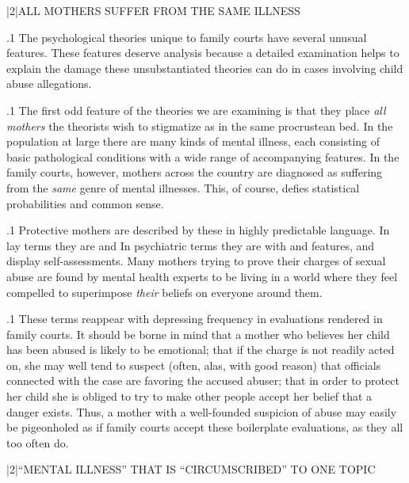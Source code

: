 \documentclass[11pt, twoside]{article}
\begin{document}
{\s|2|{ALL MOTHERS SUFFER FROM THE SAME ILLNESS}

\p.1{%
\noindent{}The psychological theories unique to family courts have several unusual
features. These features deserve analysis because a detailed examination
helps to explain the damage these unsubstantiated theories can do in
cases involving child abuse allegations.
}%

\p.1{%
The first odd feature of the theories we are examining is that they
place \textit{all mothers} the theorists wish to stigmatize as  in the same procrustean bed. In the population at large there
are many kinds of mental illness, each consisting of basic pathological
conditions with a wide range of accompanying features. In the family
courts, however, mothers across the country are diagnosed as suffering
from the \textit{same} genre of mental illnesses. This, of course, defies statistical
probabilities and common sense.
}%

\p.1{%
Protective mothers are described by these  in highly predictable language. In lay terms they are     and 
In psychiatric terms they are 
with 
 and  features, and display
 self-assessments.
Many mothers trying to prove their charges of sexual abuse
are found by mental health experts to be living in a  world
where they feel compelled to superimpose \textit{their} beliefs on everyone
around them.
}%

\p.1{%
These terms reappear with depressing frequency in  evaluations rendered in family courts. It should be borne in mind that a mother
who believes her child has been abused is likely to be emotional; that if
the charge is not readily acted on, she may well tend to suspect (often,
alas, with good reason) that officials connected with the case are favoring
the accused abuser; that in order to protect her child she is obliged to try to make
other people accept her belief that a danger exists. Thus, a mother with a
well-founded suspicion of abuse may easily be pigeonholed as  if family courts accept these boilerplate evaluations, as they all too
often do.
}%


\s|2|{``MENTAL ILLNESS'' THAT IS ``CIRCUMSCRIBED'' TO ONE TOPIC}

}
\end{document}
